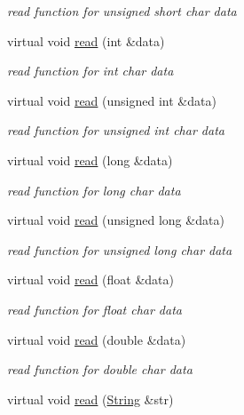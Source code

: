 \begin{DoxyCompactItemize}
\begin{DoxyCompactList}\small\item\em read function for unsigned short char data \end{DoxyCompactList}\item 
virtual void \hyperlink{class_magnum_1_1_input_stream_a16a7d16c2f51b3faf13f86f32cd3e270}{read} (int \&data)
\begin{DoxyCompactList}\small\item\em read function for int char data \end{DoxyCompactList}\item 
virtual void \hyperlink{class_magnum_1_1_input_stream_a152c62d9b82bcf884890cca238abadbb}{read} (unsigned int \&data)
\begin{DoxyCompactList}\small\item\em read function for unsigned int char data \end{DoxyCompactList}\item 
virtual void \hyperlink{class_magnum_1_1_input_stream_a84479e2001dff1fc51995160016e8be3}{read} (long \&data)
\begin{DoxyCompactList}\small\item\em read function for long char data \end{DoxyCompactList}\item 
virtual void \hyperlink{class_magnum_1_1_input_stream_a6b1584f2a210b0840438261b0bd3d62c}{read} (unsigned long \&data)
\begin{DoxyCompactList}\small\item\em read function for unsigned long char data \end{DoxyCompactList}\item 
virtual void \hyperlink{class_magnum_1_1_input_stream_a38fbf71a866a48705f5eaa189307c5d3}{read} (float \&data)
\begin{DoxyCompactList}\small\item\em read function for float char data \end{DoxyCompactList}\item 
virtual void \hyperlink{class_magnum_1_1_input_stream_aa040912555e5c5216569a5bbe95523f1}{read} (double \&data)
\begin{DoxyCompactList}\small\item\em read function for double char data \end{DoxyCompactList}\item 
virtual void \hyperlink{class_magnum_1_1_input_stream_a953c23b6d7d9731d23c4bcdcccb2061b}{read} (\hyperlink{class_magnum_1_1_string}{String} \&str)

\end{DoxyCompactItemize}
